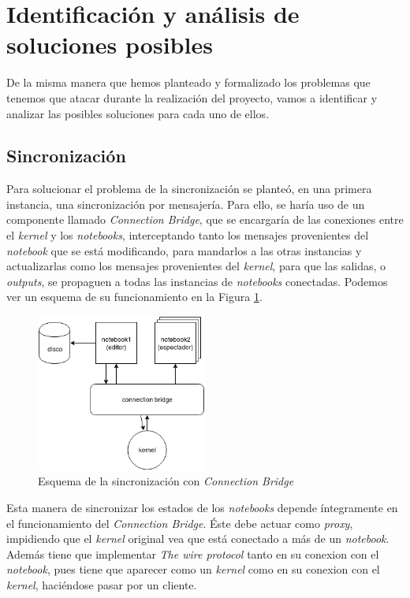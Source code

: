 \documentclass[11pt,spanish,listoffigures]{tfgetsinf}
\begin{document}

\section{Identificación y análisis de soluciones posibles}
\label{sec:ident-soluciones}

De la misma manera que hemos planteado y formalizado los problemas que tenemos que atacar durante la realización del proyecto, vamos a identificar y analizar las posibles soluciones para cada uno de ellos. 


\subsection{Sincronización}
\label{subsec:sincro}

Para solucionar el problema de la sincronización se planteó, en una primera instancia, una sincronización por mensajería. Para ello, se haría uso de un componente llamado \textit{Connection Bridge}, que se encargaría de las conexiones entre el \textit{kernel} y los \textit{notebooks}, interceptando tanto los mensajes provenientes del \textit{notebook} que se está modificando, para mandarlos a las otras instancias y actualizarlas como los mensajes provenientes del \textit{kernel}, para que las salidas, o \textit{outputs}, se propaguen a todas las instancias de \textit{notebooks} conectadas. Podemos ver un esquema de su funcionamiento en la Figura \ref{fig:cb-scheme}.

\begin{figure}[h]
	\centering
  	\includegraphics[width=0.5\textwidth]{Connection_Bridge.png}
  	\caption{Esquema de la sincronización con \textit{Connection Bridge}}
  	\label{fig:cb-scheme}
\end{figure}

Esta manera de sincronizar los estados de los \textit{notebooks} depende íntegramente en el funcionamiento del \textit{Connection Bridge}. Éste debe actuar como \textit{proxy}, impidiendo que el \textit{kernel} original vea que está conectado a más de un \textit{notebook}. Además tiene que implementar \textit{The wire protocol} \cite{wire-protocol} tanto en su conexion con el \textit{notebook}, pues tiene que aparecer como un \textit{kernel} como en su conexion con el \textit{kernel}, haciéndose pasar por un cliente. 
\end{document}
